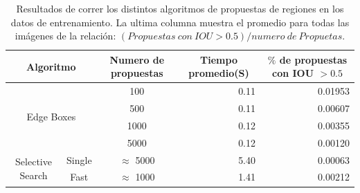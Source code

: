 \begin{table}[H]
	\centering
	\resizebox{\textwidth}{!} {
		\begin{tabular}{|c|c|c|r|r|}
			\hline
			\multicolumn{2}{|c|}{Algoritmo}                   & Numero de propuestas & \multicolumn{1}{c|}{Tiempo promedio(S)} & \multicolumn{1}{c|}{$\%$ de propuestas con IOU $> 0.5$} \\ \hline
			\multicolumn{2}{|c|}{\multirow{4}{*}{Edge Boxes}} & 100                  & 0.11                                    & 0.01953                                                \\ \cline{3-5} 
			\multicolumn{2}{|c|}{}                            & 500                  & 0.11                                    & 0.00607                                                \\ \cline{3-5} 
			\multicolumn{2}{|c|}{}                            & 1000                 & 0.12                                    & 0.00355                                                \\ \cline{3-5} 
			\multicolumn{2}{|c|}{}                            & 5000                 & 0.12                                    & 0.00120                                                \\ \hline
			\multirow{2}{*}{Selective Search}     & Single    & $\approx$ 5000       & 5.40                                    & 0.00063                                                \\ \cline{2-5} 
			& Fast      & $\approx$ 1000       & 1.41                                    & 0.00212                                                \\ \hline
		\end{tabular}
	}                                                 
	\caption{Resultados de correr los distintos algoritmos de propuestas de regiones en los datos de entrenamiento. La ultima columna muestra el promedio para todas las imágenes de la relación: $(Propuestas\ con\ IOU > 0.5) / numero\ de\ Propuetas$.}
	\label{tabla:edgeVSselct}
\end{table}

